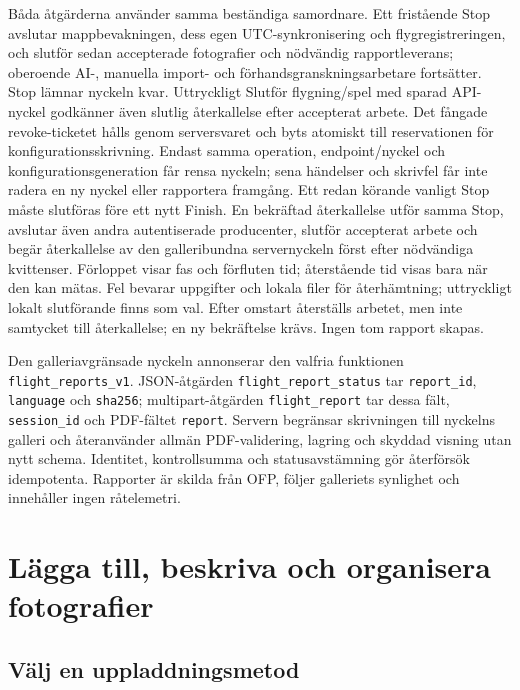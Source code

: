 \documentclass[11pt,a4paper]{article}
\begin{document}
Båda åtgärderna använder samma beständiga samordnare. Ett fristående Stop
avslutar mappbevakningen, dess egen UTC-synkronisering och flygregistreringen,
och slutför sedan accepterade fotografier och nödvändig rapportleverans;
oberoende AI-, manuella import- och förhandsgranskningsarbetare fortsätter.
Stop lämnar nyckeln kvar. Uttryckligt Slutför flygning/spel med sparad API-nyckel
godkänner även slutlig återkallelse efter accepterat arbete. Det fångade
revoke-ticketet hålls genom serversvaret och byts atomiskt till reservationen
för konfigurationsskrivning. Endast samma operation, endpoint/nyckel och
konfigurationsgeneration får rensa nyckeln; sena händelser och skrivfel får
inte radera en ny nyckel eller rapportera framgång. Ett redan körande vanligt
Stop måste slutföras före ett nytt Finish.
En bekräftad återkallelse utför samma Stop, avslutar
även andra autentiserade producenter, slutför accepterat arbete och begär
återkallelse av den galleribundna servernyckeln först efter nödvändiga
kvittenser.
Förloppet visar fas och förfluten tid; återstående tid visas bara när den kan
mätas. Fel bevarar uppgifter och lokala filer för återhämtning; uttryckligt
lokalt slutförande finns som val. Efter omstart återställs arbetet, men inte
samtycket till återkallelse; en ny bekräftelse krävs. Ingen tom rapport skapas.

Den galleriavgränsade nyckeln annonserar den valfria funktionen
\texttt{flight\_reports\_v1}. JSON-åtgärden
\texttt{flight\_report\_status} tar \texttt{report\_id},
\texttt{language} och \texttt{sha256}; multipart-åtgärden
\texttt{flight\_report} tar dessa fält, \texttt{session\_id} och
PDF-fältet \texttt{report}. Servern begränsar skrivningen till nyckelns galleri
och återanvänder allmän PDF-validering, lagring och skyddad visning utan nytt
schema. Identitet, kontrollsumma och statusavstämning gör återförsök
idempotenta.
Rapporter är skilda från OFP, följer galleriets synlighet och innehåller ingen
råtelemetri.

\section{Lägga till, beskriva och organisera fotografier}
\label{sec:photo-workflow}

\subsection{Välj en uppladdningsmetod}
\end{document}

